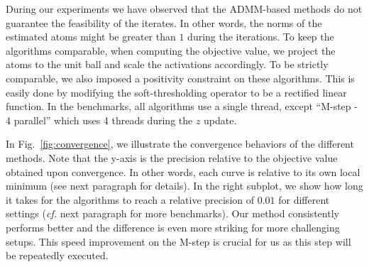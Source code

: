 


During our experiments we have observed that the ADMM-based methods do not guarantee the feasibility of the iterates. In other words, the norms of the estimated atoms might be greater than $1$ during the iterations. To keep the algorithms comparable, when computing the objective value, we project the atoms to the unit ball and scale the activations accordingly. To be strictly comparable, we also imposed a positivity constraint on these algorithms. This is easily done by modifying the soft-thresholding operator to be a rectified linear function. In the benchmarks, all algorithms use a single thread, except ``M-step - 4 parallel'' which uses 4 threads during the $z$ update.

In Fig.~\ref{fig:convergence}, we illustrate the convergence behaviors of the different methods.
Note that the y-axis is the precision relative to the objective value obtained upon convergence. In other words, each curve is relative to its own local minimum (see next paragraph for details).
In the right subplot, we show how long it takes for the algorithms to reach a relative precision of $0.01$ for different settings (\textit{cf.} next paragraph for more benchmarks). Our method consistently performs better and the difference is even more striking for more challenging setups. This speed improvement on the M-step is crucial for us as this step will be repeatedly executed. %
%
%
%
%
%

